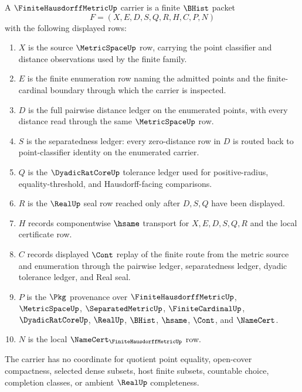 \begin{definition}
\label{def:finite-hausdorff-metric-carrier}
A $\FiniteHausdorffMetricUp$ carrier is a finite $\BHist$ packet
$$
F=(X,E,D,S,Q,R,H,C,P,N)
$$
with the following displayed rows:
\begin{enumerate}
\item $X$ is the source $\MetricSpaceUp$ row, carrying the point classifier and distance observations used by the finite family.
\item $E$ is the finite enumeration row naming the admitted points and the finite-cardinal boundary through which the carrier is inspected.
\item $D$ is the full pairwise distance ledger on the enumerated points, with every distance read through the same $\MetricSpaceUp$ row.
\item $S$ is the separatedness ledger: every zero-distance row in $D$ is routed back to point-classifier identity on the enumerated carrier.
\item $Q$ is the $\DyadicRatCoreUp$ tolerance ledger used for positive-radius, equality-threshold, and Hausdorff-facing comparisons.
\item $R$ is the $\RealUp$ seal row reached only after $D,S,Q$ have been displayed.
\item $H$ records componentwise $\hsame$ transport for $X,E,D,S,Q,R$ and the local certificate row.
\item $C$ records displayed $\Cont$ replay of the finite route from the metric source and enumeration through the pairwise ledger, separatedness ledger, dyadic tolerance ledger, and Real seal.
\item $P$ is the $\Pkg$ provenance over $\FiniteHausdorffMetricUp$, $\MetricSpaceUp$, $\SeparatedMetricUp$, $\FiniteCardinalUp$, $\DyadicRatCoreUp$, $\RealUp$, $\BHist$, $\hsame$, $\Cont$, and $\NameCert$.
\item $N$ is the local $\NameCert_{\FiniteHausdorffMetricUp}$ row.
\end{enumerate}
The carrier has no coordinate for quotient point equality, open-cover compactness, selected dense subsets, host finite subsets, countable choice, completion classes, or ambient $\RealUp$ completeness.
\end{definition}


